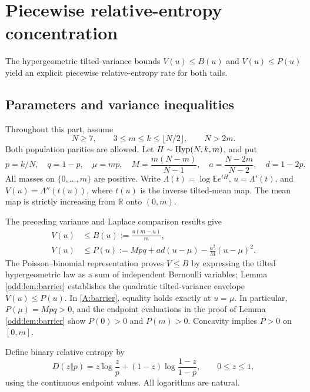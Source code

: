 \documentclass[11pt,a4paper]{article}
\newcommand{\E}{\mathbb E}\newcommand{\R}{\mathbb R}\newcommand{\N}{\mathbb N}\newcommand{\one}{\mathbf1}
\begin{document}
\section{Piecewise relative-entropy concentration}\label{sec:piecewise}
The hypergeometric tilted-variance bounds $V(u)\le B(u)$ and $V(u)\le P(u)$ yield an explicit piecewise relative-entropy rate for both tails.

\subsection{Parameters and variance inequalities}
Throughout this part, assume
\begin{equation}\label{A:domain}
 N\ge7,\qquad 3\le m\le k\le\lfloor N/2\rfloor,\qquad N>2m.
\end{equation}
Both population parities are allowed. Let $H\sim\operatorname{Hyp}(N,k,m)$, and put
\[
 p=k/N,\quad q=1-p,\quad \mu=mp,\quad
 M=\frac{m(N-m)}{N-1},\quad a=\frac{N-2m}{N-2},\quad d=1-2p.
\]
All masses on $\{0,\ldots,m\}$ are positive. Write
$\Lambda(t)=\log\E e^{tH}$, $u=\Lambda'(t)$, and
$V(u)=\Lambda''(t(u))$, where $t(u)$ is the inverse tilted-mean map.
The mean map is strictly increasing from $\mathbb R$ onto $(0,m)$.

The preceding variance and Laplace comparison results give
\begin{align}
 V(u)&\le B(u):=\frac{u(m-u)}m,\label{A:PB}\\
 V(u)&\le P(u):=Mpq+ad(u-\mu)-\frac{a^2}{M}(u-\mu)^2.
 \label{A:barrier}
\end{align}
The Poisson--binomial representation proves $V\le B$ by expressing the tilted hypergeometric law as a
sum of independent Bernoulli variables; Lemma \ref{odd:lem:barrier} establishes the quadratic
tilted-variance envelope $V(u)\le P(u)$. In \eqref{A:barrier}, equality holds exactly
at $u=\mu$. In particular, $P(\mu)=Mpq>0$, and the endpoint evaluations in
the proof of Lemma \ref{odd:lem:barrier} show $P(0)>0$ and $P(m)>0$. Concavity implies $P>0$ on $[0,m]$.


Define binary relative entropy by
\[
 D(z\Vert p)=z\log\frac zp+(1-z)\log\frac{1-z}{1-p},\qquad 0\le z\le1,
\]
using the continuous endpoint values. All logarithms are natural.
\end{document}

